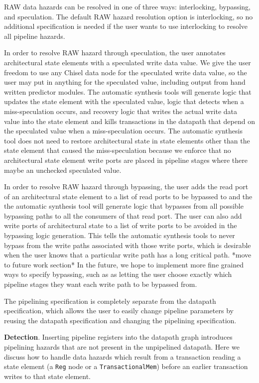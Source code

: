 RAW data hazards can be resolved in one of three ways: interlocking,
bypassing, and speculation. The default RAW hazard resolution option
is interlocking, so no additional specification is needed if the user
wants to use interlocking to resolve all pipeline hazards.

In order to resolve RAW hazard through speculation, the user annotates
architectural state elements with a speculated write data value. We
give the user freedom to use any Chisel data node for the speculated
write data value, so the user may put in anything for the speculated
value, including output from hand written predictor modules. The
automatic synthesis tools will generate logic that updates the state
element with the speculated value, logic that detects when a
miss-speculation occurs, and recovery logic that writes the actual write
data value into the state element and kills transactions in the
datapath that depend on the speculated value when a miss-speculation
occurs. The automatic synthesis tool does not need to restore
architectural state in state elements other than the state element that
caused the miss-speculation because we enforce that no architectural
state element write ports are placed in pipeline stages where there
maybe an unchecked speculated value. 

In order to resolve RAW hazard through bypassing, the user adds the
read port of an architectural state element to a list of read ports to
be bypassed to and the the automatic synthesis tool will generate logic
that bypasses from all possible bypassing paths to all the consumers
of that read port. The user can also
add write ports of architectural state to a list of write ports to be avoided in the bypassing logic generation. This tells the automatic synthesis tools to never
bypass from the write paths associated with those write ports, which
is desirable when the user knows that a particular write path has a
long critical path. *move to future work section* In the future, we
hope to implement more fine grained ways to specify bypassing, such as
as letting the user choose exactly which pipeline stages they want
each write path to be bypassed from.

The pipelining specification is completely separate from the datapath
specification, which allows the user to easily change pipeline
parameters by reusing the datapath specification and changing the
pipelining specification.

{\bf Detection}. Inserting pipeline registers into the datapath
graph introduces pipelining hazards that are not present in the
unpipelined datapath. Here we discuss how to handle data hazards which
result from a transaction reading a state element (a {\tt Reg} node or a
{\tt TransactionalMem}) before an earlier transaction writes to that state
element. 

